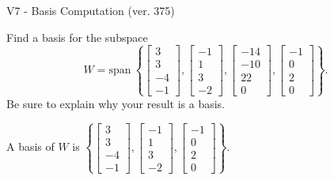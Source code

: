 \begin{exercise}
  \begin{exerciseTitle}V7 - Basis Computation (ver. 375)\end{exerciseTitle}
  \begin{exerciseStatement}
    Find a basis for the subspace 
\[W=\mathrm{span}\ \left\{\left[\begin{array}{r}
3 \\
3 \\
-4 \\
-1
\end{array}\right] , \left[\begin{array}{r}
-1 \\
1 \\
3 \\
-2
\end{array}\right] , \left[\begin{array}{r}
-14 \\
-10 \\
22 \\
0
\end{array}\right] , \left[\begin{array}{r}
-1 \\
0 \\
2 \\
0
\end{array}\right]\right\}.\]
 Be sure to explain why your result is a basis.


  \end{exerciseStatement}
  \begin{exerciseAnswer}
   A basis of \(W\) is  \(\left\{\left[\begin{array}{r}
3 \\
3 \\
-4 \\
-1
\end{array}\right] , \left[\begin{array}{r}
-1 \\
1 \\
3 \\
-2
\end{array}\right] , \left[\begin{array}{r}
-1 \\
0 \\
2 \\
0
\end{array}\right]\right\}\).
  


  \end{exerciseAnswer}
\end{exercise}